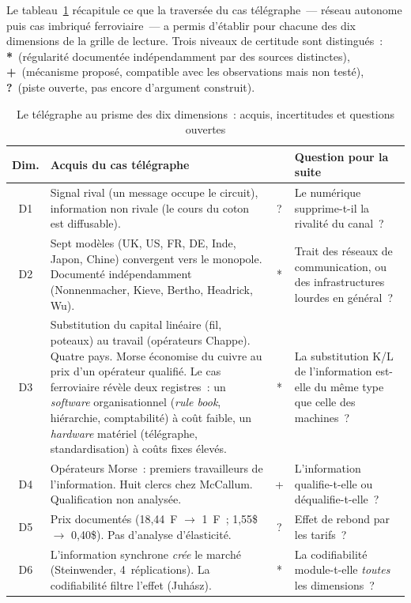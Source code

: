 Le tableau~\ref{tab:telegraphe-dimensions} récapitule ce que la traversée du cas télégraphe~--- réseau autonome puis cas imbriqué ferroviaire~--- a permis d'établir pour chacune des dix dimensions de la grille de lecture. Trois niveaux de certitude sont distingués~: \textbf{*}~(régularité documentée indépendamment par des sources distinctes), \textbf{+}~(mécanisme proposé, compatible avec les observations mais non testé), \textbf{?}~(piste ouverte, pas encore d'argument construit).

\begin{table}[p]
\caption{Le télégraphe au prisme des dix dimensions~: acquis, incertitudes et questions ouvertes}\label{tab:telegraphe-dimensions}
\centering\footnotesize
\renewcommand{\arraystretch}{1.15}
\begin{tabularx}{\textwidth}{@{}cXcp{4.8cm}@{}}
\toprule
\textbf{Dim.} & \textbf{Acquis du cas télégraphe} & & \textbf{Question pour la suite} \\
\midrule
D1 & Signal rival (un message occupe le circuit), information non rivale (le cours du coton est diffusable). & ? & Le numérique supprime-t-il la rivalité du canal~? \\[3pt]
D2 & Sept modèles (UK, US, FR, DE, Inde, Japon, Chine) convergent vers le monopole. Documenté indépendamment (Nonnenmacher, Kieve, Bertho, Headrick, Wu). & * & Trait des réseaux de communication, ou des infrastructures lourdes en général~? \\[3pt]
D3 & Substitution du capital linéaire (fil, poteaux) au travail (opérateurs Chappe). Quatre pays. Morse économise du cuivre au prix d'un opérateur qualifié. Le cas ferroviaire révèle deux registres~: un \emph{software} organisationnel (\emph{rule book}, hiérarchie, comptabilité) à coût faible, un \emph{hardware} matériel (télégraphe, standardisation) à coûts fixes élevés. & * & La substitution K/L de l'information est-elle du même type que celle des machines~? \\[3pt]
D4 & Opérateurs Morse~: premiers travailleurs de l'information. Huit clercs chez McCallum. Qualification non analysée. & + & L'information qualifie-t-elle ou déqualifie-t-elle~? \\[3pt]
D5 & Prix documentés (18,44~F $\rightarrow$ 1~F~; 1,55\$ $\rightarrow$ 0,40\$). Pas d'analyse d'élasticité. & ? & Effet de rebond par les tarifs~? \\[3pt]
D6 & L'information synchrone \emph{crée} le marché (Steinwender, 4~réplications). La codifiabilité filtre l'effet (Juhász). & * & La codifiabilité module-t-elle \emph{toutes} les dimensions~? \\[3pt]

\end{tabularx}
\end{table}
